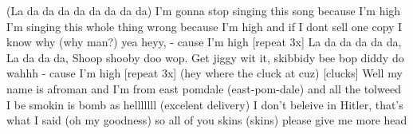 \endverse
\beginverse*\singlespacing
(La da da da da da da da da)
\endverse
\beginverse*\singlespacing
I'm gonna stop singing this song because I'm high
I'm singing this whole thing wrong because I'm high
and if I dont sell one copy I know why (why man?) yea heyy,
- cause I'm high [repeat 3x]
\endverse
\beginverse*\singlespacing
La da da da da da, La da da da, Shoop shooby doo wop.
\endverse
\beginverse*\singlespacing
Get jiggy wit it, skibbidy bee bop diddy do wahhh
\endverse
\beginverse*\singlespacing
- cause I'm high [repeat 3x]
\endverse
\beginverse*\singlespacing
(hey where the cluck at cuz) [clucks]
\endverse
\beginverse*\singlespacing
Well my name is afroman and I'm from east pomdale (east-pom-dale)
and all the tolweed I be smokin is bomb as helllllll (excelent delivery)
I don't beleive in Hitler, that's what I said (oh my goodness)
so all of you skins (skins) please give me more head 
\endverse
\endsong